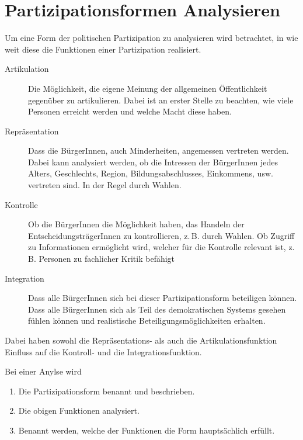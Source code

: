 \documentclass{article}
\begin{document}
\section{Partizipationsformen Analysieren}
Um eine Form der politischen Partizipation zu analysieren wird betrachtet, in wie weit diese die Funktionen einer Partizipation realisiert.
\begin{description}
 \item[Artikulation] Die Möglichkeit, die eigene Meinung der allgemeinen Öffentlichkeit gegenüber zu artikulieren. Dabei ist an erster Stelle zu beachten, wie viele Personen erreicht werden und welche Macht diese haben.
 \item[Repräsentation] Dass die BürgerInnen, auch Minderheiten, angemessen vertreten werden. Dabei kann analysiert werden, ob die Intressen der BürgerInnen jedes Alters, Geschlechts, Region, Bildungsabschlusses, Einkommens, usw. vertreten sind. In der Regel durch Wahlen.
 \item[Kontrolle] Ob die BürgerInnen die Möglichkeit haben, das Handeln der EntscheidungsträgerInnen zu kontrollieren, z.\,B. durch Wahlen. Ob Zugriff zu Informationen ermöglicht wird, welcher für die Kontrolle relevant ist, z.\,B. Personen zu fachlicher Kritik befähigt
 \item[Integration] Dass alle BürgerInnen sich bei dieser Partizipationsform beteiligen können. Dass alle BürgerInnen sich als Teil des demokratischen Systems gesehen fühlen können und realistische Beteiligungsmöglichkeiten erhalten.
\end{description} 
Dabei haben sowohl die Repräsentations- als auch die Artikulationsfunktion Einfluss auf die Kontroll- und die Integrationsfunktion.
 
Bei einer Anylse wird
\begin{enumerate}
 \item Die Partizipationsform benannt und beschrieben.
 \item Die obigen Funktionen analysiert.
 \item Benannt werden, welche der Funktionen die Form hauptsächlich erfüllt. 
\end{enumerate} 
\end{document}
